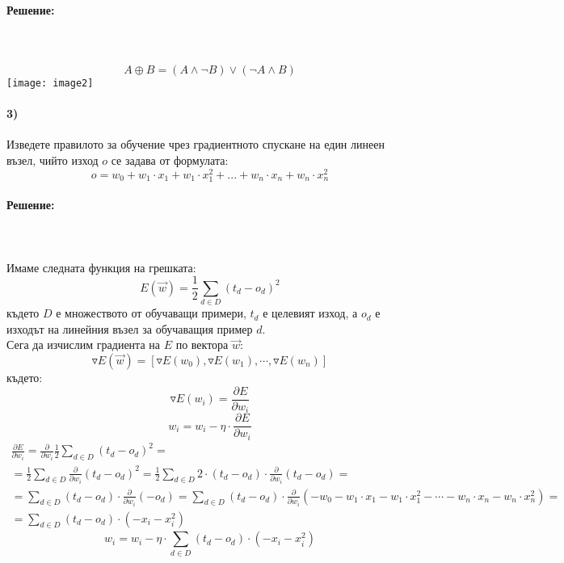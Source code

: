 \documentclass{article}
\begin{document}
\begin{enumerate}
\paragraph{Решение:}\mbox{}\\\\
$$A \oplus B = ( A \land \neg B ) \lor ( \neg A \land B )$$
\texttt{[image: image2]}
\end{enumerate}

\paragraph{3)} Изведете правилото за обучение чрез градиентното спускане на един линеен
възел, чийто изход $o$ се задава от формулата:
$$o = w_0 + w_1 \cdot x_1 + w_1 \cdot x_1^2 + ... + w_n \cdot x_n + w_n \cdot x_n^2$$

\paragraph{Решение:}\mbox{}\\\\
Имаме следната функция на грешката:
$$E(\overrightarrow{w}) = \frac{1}{2} \sum_{d \in D} (t_d - o_d)^2$$
където $D$ е множеството от обучаващи примери, $t_d$ е целевият изход, а $o_d$ е
изходът на линейния възел за обучаващия пример $d$.\\
Сега да изчислим градиента на $E$ по вектора $\overrightarrow{w}$:
$$\triangledown E(\overrightarrow{w}) = 
\left[ 
	\triangledown E(w_0), \triangledown E(w_1), \cdots, \triangledown E(w_n)
\right]$$
където:
$$\triangledown E(w_i) = \frac{\partial E}{\partial w_i}$$
$$w_i = w_i - \eta \cdot \frac{\partial E}{\partial w_i}$$
\begin{multline}
\frac{\partial E}{\partial w_i} = \frac{\partial}{\partial w_i} \frac{1}{2} \sum_{d \in D} (t_d - o_d)^2 = \\ = \frac{1}{2} \sum_{d \in D} \frac{\partial}{\partial w_i} (t_d - o_d)^2 = \frac{1}{2} \sum_{d \in D} 2 \cdot (t_d - o_d) \cdot \frac{\partial}{\partial w_i} (t_d - o_d) = \\ = \sum_{d \in D} (t_d - o_d) \cdot \frac{\partial}{\partial w_i} (-o_d) = \sum_{d \in D} (t_d - o_d) \cdot \frac{\partial}{\partial w_i} (-w_0 - w_1 \cdot x_1 - w_1 \cdot x_1^2 - \cdots - w_n \cdot x_n - w_n \cdot x_n^2) = \\ =  \sum_{d \in D} (t_d - o_d) \cdot (-x_i - x_i^2)
\end{multline}
$$w_i = w_i - \eta \cdot \sum_{d \in D} (t_d - o_d) \cdot (-x_i - x_i^2)$$
\end{document}
